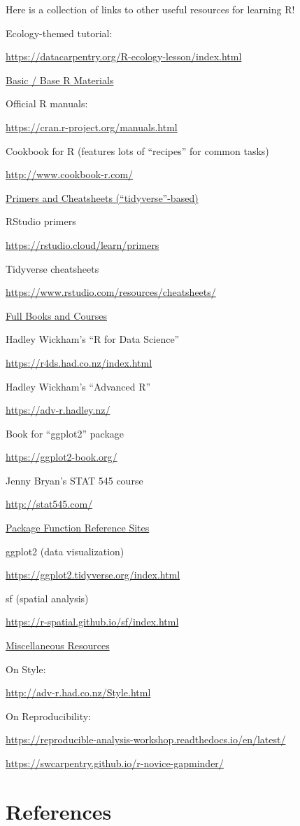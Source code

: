 \documentclass[
  letterpaper,
  DIV=11,
  numbers=noendperiod]{scrreprt}
\newlength{\cslhangindent}
\newlength{\cslentryspacingunit} %
\newenvironment{CSLReferences}[2] %
 {%
  \setlength{\parindent}{0pt}
  \ifodd #1
  \let\oldpar\par
  \def\par{\hangindent=\cslhangindent\oldpar}
  \fi
  \setlength{\parskip}{#2\cslentryspacingunit}
 }%
 {}
\begin{document}
Here is a collection of links to other useful resources for learning R!

Ecology-themed tutorial:

\url{https://datacarpentry.org/R-ecology-lesson/index.html}

\ul{Basic / Base R Materials}

Official R manuals:

\url{https://cran.r-project.org/manuals.html}

Cookbook for R (features lots of ``recipes'' for common tasks)

\url{http://www.cookbook-r.com/}

\ul{Primers and Cheatsheets (``tidyverse''-based)}

RStudio primers

\url{https://rstudio.cloud/learn/primers}

Tidyverse cheatsheets

\url{https://www.rstudio.com/resources/cheatsheets/}

\ul{Full Books and Courses}

Hadley Wickham's ``R for Data Science''

\url{https://r4ds.had.co.nz/index.html}

Hadley Wickham's ``Advanced R''

\url{https://adv-r.hadley.nz/}

Book for ``ggplot2'' package

\url{https://ggplot2-book.org/}

Jenny Bryan's STAT 545 course

\url{http://stat545.com/}

\ul{Package Function Reference Sites}

ggplot2 (data visualization)

\url{https://ggplot2.tidyverse.org/index.html}

sf (spatial analysis)

\url{https://r-spatial.github.io/sf/index.html}

\ul{Miscellaneous Resources}

On Style:

\url{http://adv-r.had.co.nz/Style.html}

On Reproducibility:

\url{https://reproducible-analysis-workshop.readthedocs.io/en/latest/}

\url{https://swcarpentry.github.io/r-novice-gapminder/}


\hypertarget{references}{%
\chapter*{References}\label{references}}


\hypertarget{refs}{}
\begin{CSLReferences}{0}{0}
\end{CSLReferences}
\end{document}

